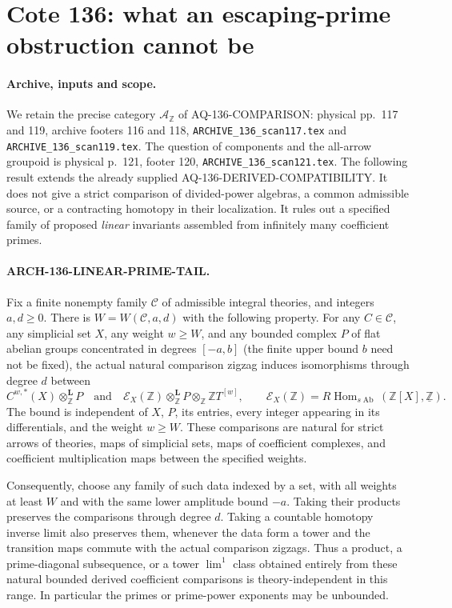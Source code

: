 \section{Cote 136: what an escaping-prime obstruction cannot be}
\label{sec:136linearprimetail}

\paragraph{Archive, inputs and scope.}
We retain the precise category $\mathcal A_{\mathbb Z}$ of
AQ-136-COMPARISON: physical pp.~117 and 119, archive footers 116
and 118, \texttt{ARCHIVE\_136\_scan117.tex} and
\texttt{ARCHIVE\_136\_scan119.tex}. The question of components and
the all-arrow groupoid is physical p.~121, footer 120,
\texttt{ARCHIVE\_136\_scan121.tex}.
The following result extends the already supplied
AQ-136-DERIVED-COMPATIBILITY. It does not give a strict comparison
of divided-power algebras, a common admissible source, or a
contracting homotopy in their localization. It rules out a
specified family of proposed \emph{linear} invariants assembled
from infinitely many coefficient primes.

\paragraph{ARCH-136-LINEAR-PRIME-TAIL.}
Fix a finite nonempty family $\mathscr C$ of admissible integral
theories, and integers $a,d\geq0$. There is $W=W(\mathscr C,a,d)$
with the following property. For any $C\in\mathscr C$, any
simplicial set $X$, any weight $w\geq W$, and any bounded complex
$P$ of flat abelian groups concentrated in degrees $[-a,b]$
(the finite upper bound $b$ need not be fixed), the actual natural
comparison zigzag induces isomorphisms through degree $d$ between
\[
 C^{w,*}(X)\otimes^{\mathbf L}_{\mathbb Z}P
 \quad\text{and}\quad
 \mathcal E_X(\mathbb Z)\otimes^{\mathbf L}_{\mathbb Z}P
                         \otimes_{\mathbb Z}\mathbb ZT^{[w]},
 \qquad
 \mathcal E_X(\mathbb Z)=
 R\operatorname{Hom}_{s\operatorname{Ab}}
       (\mathbb Z[X],\underline{\mathbb Z}).                 \tag{136.LP1}
\]
The bound is independent of $X$, $P$, its entries, every integer
appearing in its differentials, and the weight $w\geq W$.
These comparisons are natural for strict arrows of theories,
maps of simplicial sets, maps of coefficient complexes, and
coefficient multiplication maps between the specified weights.

Consequently, choose any family of such data indexed by a set,
with all weights at least $W$ and with the same lower amplitude
bound $-a$. Taking their products preserves the comparisons
through degree $d$. Taking a countable homotopy inverse limit
also preserves them, whenever the data form a tower and the
transition maps commute with the actual comparison zigzags.
Thus a product, a prime-diagonal subsequence, or a tower
$\lim^1$ class obtained entirely from these natural bounded
derived coefficient comparisons is theory-independent in this
range. In particular the primes or prime-power exponents may
be unbounded.

